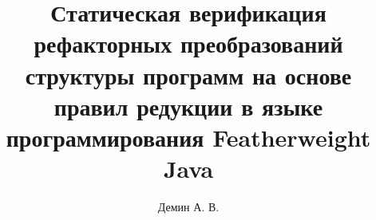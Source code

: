 \documentclass{itmo-student-thesis}
\begin{document}
\lstset{
    frame=single,
}

\title{Статическая верификация рефакторных преобразований структуры программ на основе правил редукции в языке программирования Featherweight Java}
\author{Демин А. В.}

\makemastertitle

\tableofcontents







\printbibliography[heading=trueHeading]
\end{document}
